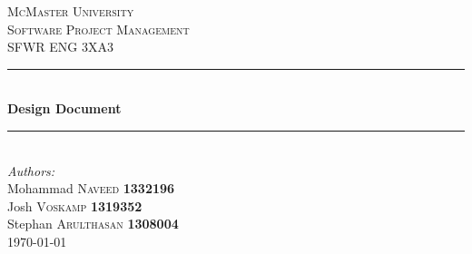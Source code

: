 \documentclass[12pt]{article}
\begin{document}
\sloppy

\begin{titlepage}

\newcommand{\HRule}{\rule{\linewidth}{0.5mm}} %

\center %
 

\textsc{\LARGE McMaster University}\\[1.5cm] %
\textsc{\Large Software Project Management}\\[0.5cm] %
\textsc{\large SFWR ENG 3XA3}\\[0.5cm] %


\HRule \\[0.4cm]
{ \huge \bfseries Design Document}\\[0.4cm] %
\HRule \\[1.5cm]
 



\Large \emph{Authors:}\\
Mohammad \textsc{Naveed} \textbf{1332196} \\ %
Josh \textsc{Voskamp} \textbf{1319352} \\
Stephan \textsc{Arulthasan} \textbf{1308004} \\[3cm]

{\large \today}\\[3cm] %


 

\vfill %

\end{titlepage}
\end{document}
